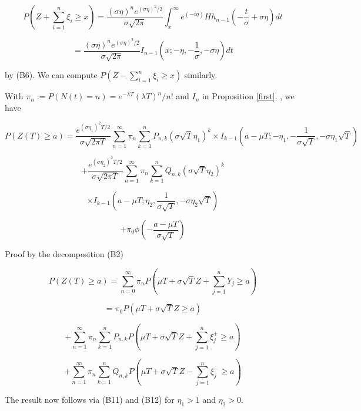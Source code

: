 $$P(Z+\sum_{i=1}^{n}\xi_{i}\geq x)=\frac{(\sigma\eta)^{n}e^{(\sigma\eta)^{2}/2}}{\sigma\sqrt{2\pi}}\int_{x}^{\infty}e^{(-i\eta)}Hh_{n-1}(-\frac{t}{\sigma}+\sigma\eta)dt$$

$$=\frac{(\sigma\eta)^{n}e^{(\sigma\eta)^{2}/2}}{\sigma\sqrt{2\pi}}I_{n-1}(x;-\eta,-\frac{1}{\sigma},-\sigma\eta)dt$$

by (B6). We can compute
$P(Z-\sum_{i=1}^{n}\xi_{i}\geq x)$ similarly.

 With $\pi_{n}:= P(N(t)=n)=e^{-\lambda T}(\lambda T)^{n}/n!$ and $I_{n}$ in Proposition \ref{first}.
, we have

$$P(Z(T)\geq a)=\frac{e^{(\sigma \eta_{1})^{2} T/2}}{\sigma \sqrt{2 \pi T}} \sum_{n=1}^{\infty} \pi_{n} \sum_{k=1}^{n} P_{n,k}(\sigma\sqrt{T}\eta_{1})^{k}\times I_{k-1}(a-\mu T; -\eta_{1},-\frac{1}{\sigma\sqrt{T}},-\sigma\eta_{1}\sqrt{T})$$

$$+\frac{e^{(\sigma\eta_{2})^{2}T/2}}{\sigma\sqrt{2\pi T}}\sum_{n=1}^{\infty}\pi_{n}\sum_{k=1}^{n}Q_{n,k}(\sigma\sqrt{T}\eta_{2})^{k}$$

$$\times I_{k-1}(a-\mu T; \eta_{2},\frac{1}{\sigma\sqrt{T}},-\sigma\eta_{2}\sqrt{T})$$

$$+\pi_{0}\phi(-\frac{a-\mu T}{\sigma\sqrt{T}})$$

Proof by the decomposition (B2)

$$P(Z(T) \geq a)= \sum_{n=0}^{\infty}\pi_{n} P(\mu T +\sigma\sqrt{T} Z + \sum_{j=1}^{n}Y_{j} \geq a)$$

$$=\pi_{0}P(\mu T +\sigma\sqrt{T} Z  \geq a)$$

$$+\sum_{n=1}^{\infty}\pi_{n}\sum_{k=1}^{n}P_{n,k} P(\mu T +\sigma\sqrt{T} Z + \sum_{j=1}^{n}\xi_{j}^{+} \geq a)$$

$$+\sum_{n=1}^{\infty}\pi_{n}\sum_{k=1}^{n}Q_{n,k} P(\mu T +\sigma\sqrt{T} Z - \sum_{j=1}^{n}\xi_{j}^{-} \geq a)$$

The result now follows via (B11) and (B12) for $\eta_{1} > 1$ and $\eta_{2} >0$.


